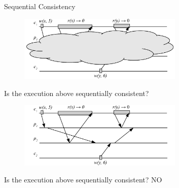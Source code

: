 \begin{frame}{Sequential Consistency}

\begin{overprint}

\begin{figure}
\includegraphics[width=0.7\textwidth]{figs/09/seq-03}
\end{figure}

\begin{example}

\BIL
\item Is the execution above sequentially consistent? 
\EIL

\end{example}

\begin{figure}
\includegraphics[width=0.7\textwidth]{figs/09/seq-03n}
\end{figure}

\begin{example}

\BIL
\item Is the execution above sequentially consistent? NO
\EIL

\end{example}

\end{overprint}

\end{frame}

